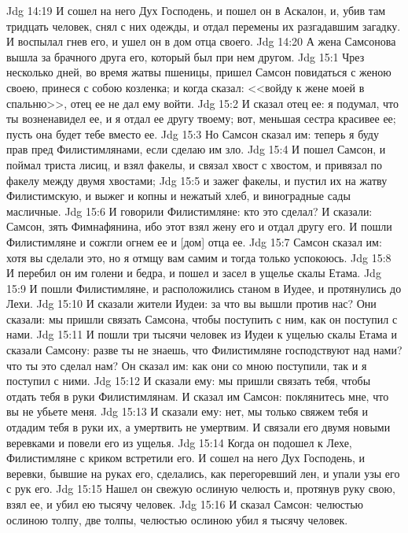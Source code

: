 \vs Jdg 14:19 И сошел на него Дух Господень, и пошел он в Аскалон, и, убив там тридцать человек, снял с них одежды, и отдал перемены  их разгадавшим загадку. И воспылал гнев его, и ушел он в дом отца своего.
\vs Jdg 14:20 А жена Самсонова вышла за брачного друга его, который был при нем другом.
\vs Jdg 15:1 Чрез несколько дней, во время жатвы пшеницы, пришел Самсон повидаться с женою своею, принеся с собою козленка; и когда сказал: <<войду к жене моей в спальню>>, отец ее не дал ему войти.
\vs Jdg 15:2 И сказал отец ее: я подумал, что ты возненавидел ее, и я отдал ее другу твоему; вот, меньшая сестра красивее ее; пусть она будет тебе вместо ее.
\vs Jdg 15:3 Но Самсон сказал им: теперь я буду прав пред Филистимлянами, если сделаю им зло.
\vs Jdg 15:4 И пошел Самсон, и поймал триста лисиц, и взял факелы, и связал хвост с хвостом, и привязал по факелу между двумя хвостами;
\vs Jdg 15:5 и зажег факелы, и пустил их на жатву Филистимскую, и выжег и копны и нежатый хлеб, и виноградные сады  масличные.
\vs Jdg 15:6 И говорили Филистимляне: кто это сделал? И сказали: Самсон, зять Фимнафянина, ибо этот взял жену его и отдал другу его. И пошли Филистимляне и сожгли огнем ее и [дом] отца ее.
\vs Jdg 15:7 Самсон сказал им: хотя вы сделали это, но я отмщу вам самим и тогда только успокоюсь.
\vs Jdg 15:8 И перебил он им голени и бедра, и пошел и засел в ущелье скалы Етама.
\vs Jdg 15:9 И пошли Филистимляне, и расположились станом в Иудее, и протянулись до Лехи.
\vs Jdg 15:10 И сказали жители Иудеи: за что вы вышли против нас? Они сказали: мы пришли связать Самсона, чтобы поступить с ним, как он поступил с нами.
\vs Jdg 15:11 И пошли три тысячи человек из Иудеи к ущелью скалы Етама и сказали Самсону: разве ты не знаешь, что Филистимляне господствуют над нами? что ты это сделал нам? Он сказал им: как они со мною поступили, так и я поступил с ними.
\vs Jdg 15:12 И сказали ему: мы пришли связать тебя, чтобы отдать тебя в руки Филистимлянам. И сказал им Самсон: поклянитесь мне, что вы не убьете меня.
\vs Jdg 15:13 И сказали ему: нет, мы только свяжем тебя и отдадим тебя в руки их, а умертвить не умертвим. И связали его двумя новыми веревками и повели его из ущелья.
\vs Jdg 15:14 Когда он подошел к Лехе, Филистимляне с криком встретили его. И сошел на него Дух Господень, и веревки, бывшие на руках его, сделались, как перегоревший лен, и упали узы его с рук его.
\vs Jdg 15:15 Нашел он свежую ослиную челюсть и, протянув руку свою, взял ее, и убил ею тысячу человек.
\vs Jdg 15:16 И сказал Самсон: челюстью ослиною толпу, две толпы, челюстью ослиною убил я тысячу человек.

